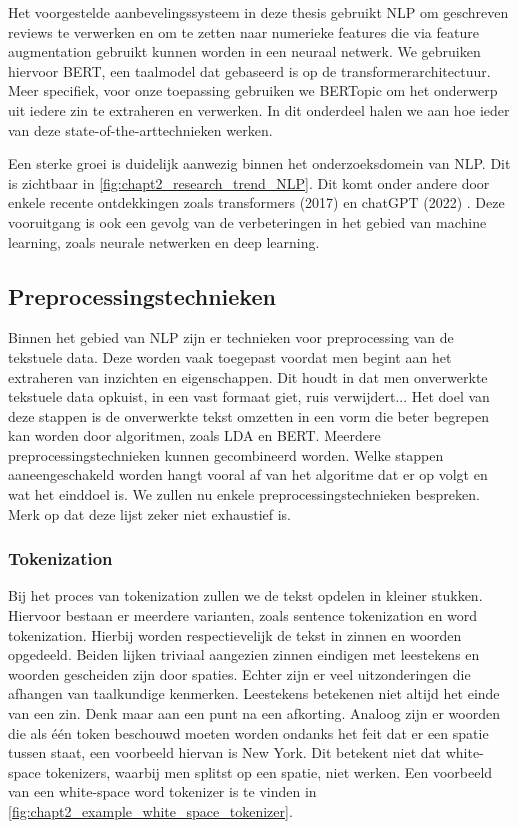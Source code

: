 Het voorgestelde aanbevelingssysteem in deze thesis gebruikt NLP om geschreven reviews te verwerken en om te zetten naar numerieke features die via feature augmentation gebruikt kunnen worden in een neuraal netwerk. We gebruiken hiervoor BERT, een taalmodel dat gebaseerd is op de transformerarchitectuur. Meer specifiek, voor onze toepassing gebruiken we BERTopic om het onderwerp uit iedere zin te extraheren en verwerken. In dit onderdeel halen we aan hoe ieder van deze state-of-the-arttechnieken werken.


Een sterke groei is duidelijk aanwezig binnen het onderzoeksdomein van NLP. Dit is zichtbaar in \autoref{fig:chapt2_research_trend_NLP}. Dit komt onder andere door enkele recente ontdekkingen zoals transformers (2017) \cite{attention_is_all_you_need} en chatGPT (2022) \cite{openai_chatgpt}. Deze vooruitgang is ook een gevolg van de verbeteringen in het gebied van machine learning, zoals neurale netwerken en deep learning.

\subsection{Preprocessingstechnieken}
Binnen het gebied van NLP zijn er technieken voor preprocessing van de tekstuele data. Deze worden vaak toegepast voordat men begint aan het extraheren van inzichten en eigenschappen. Dit houdt in dat men
onverwerkte tekstuele data opkuist, in een vast formaat giet, ruis verwijdert... Het doel van deze stappen is de onverwerkte tekst omzetten in een vorm die beter begrepen kan worden door algoritmen, zoals LDA en BERT. Meerdere preprocessingstechnieken kunnen gecombineerd worden. Welke stappen aaneengeschakeld worden hangt vooral af van het algoritme dat er op volgt en wat het einddoel is. We zullen nu enkele preprocessingstechnieken bespreken. Merk op dat deze lijst zeker niet exhaustief is.

\subsubsection{Tokenization}
\label{sub:chapt2_tokenization}
Bij het proces van tokenization \cite{tokenization_basics} zullen we de tekst opdelen in kleiner stukken. Hiervoor bestaan er meerdere varianten, zoals sentence tokenization en word tokenization.
Hierbij worden respectievelijk de tekst in zinnen en woorden opgedeeld. Beiden lijken triviaal aangezien zinnen eindigen met leestekens en woorden gescheiden zijn door spaties. Echter zijn er veel uitzonderingen die afhangen van taalkundige kenmerken. Leestekens betekenen niet altijd het einde van een zin. Denk maar aan een punt na een afkorting. Analoog zijn er woorden die als één token beschouwd moeten worden ondanks het feit dat er een spatie tussen staat, een voorbeeld hiervan is New York. Dit betekent niet dat white-space tokenizers, waarbij men splitst op een spatie, niet werken. Een voorbeeld van een white-space word tokenizer is te vinden in \autoref{fig:chapt2_example_white_space_tokenizer}.

